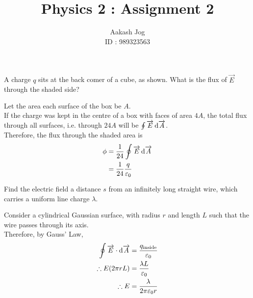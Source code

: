 \documentclass[fleqn, a4paper, 12pt, oneside]{amsart}
\title{Physics 2 : Assignment 2}
\author
{
	Aakash Jog\\
	ID : 989323563
}
\date{\formatdate{25}{3}{2015}}
\theoremstyle{definition}
\theoremstyle{theorem}
\begin{document}
	
\maketitle

\begin{question}
	A charge $q$ sits at the back comer of a cube, as shown. What is the flux of $\overrightarrow{E}$ through the shaded side?
	\begin{figure}[H]
	\end{figure}
\end{question}

\begin{solution}
	Let the area each surface of the box be $A$.\\
	If the charge was kept in the centre of a box with faces of area $4A$, the total flux through all surfaces, i.e. through $24 A$ will be $\oint \overrightarrow{E} \dif \overrightarrow{A}$.\\
	Therefore, the flux through the shaded area is 
	\begin{align*}
		\phi &= \dfrac{1}{24} \oint \overrightarrow{E} \dif \overrightarrow{A}\\
		&= \dfrac{1}{24} \dfrac{q}{\varepsilon_0}
	\end{align*}
\end{solution}

\begin{question}
	Find the electric field a distance $s$ from an infinitely long straight wire, which carries a uniform line charge $\lambda$.
\end{question}

\begin{solution}
	Consider a cylindrical Gaussian surface, with radius $r$ and length $L$ such that the wire passes through its axis.\\
	Therefore, by Gauss' Law,
	\begin{align*}
		\oint \overrightarrow{E} \cdot \dif \overrightarrow{A} &= \dfrac{q_{\textnormal{inside}}}{\varepsilon_0}\\
		\therefore E (2 \pi r L) &= \dfrac{\lambda L}{\varepsilon_0}\\
		\therefore E &= \dfrac{\lambda}{2 \pi \varepsilon_0 r}
	\end{align*}
\end{solution}
\end{document}
